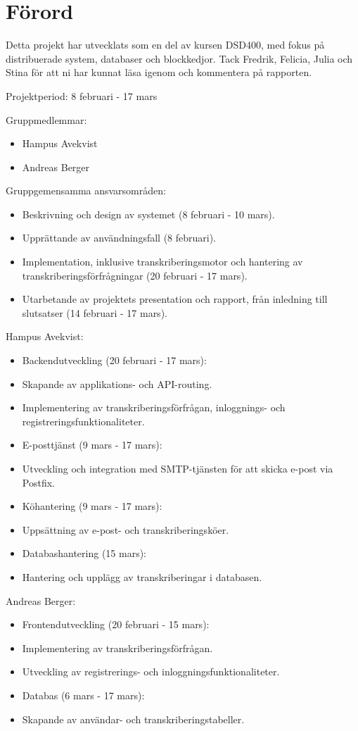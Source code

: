 \thispagestyle{plain}

\section{Förord}
Detta projekt har utvecklats som en del av kursen DSD400, med fokus på
distribuerade system, databaser och blockkedjor. Tack Fredrik, Felicia, Julia
och Stina för att ni har kunnat läsa igenom och kommentera på rapporten.

Projektperiod: 8 februari - 17 mars

Gruppmedlemmar:
\begin{itemize}
    \item Hampus Avekvist
    \item Andreas Berger
\end{itemize}

Gruppgemensamma ansvarsområden:
\begin{itemize}
    \item Beskrivning och design av systemet (8 februari - 10 mars).
    \item Upprättande av användningsfall (8 februari).
    \item Implementation, inklusive transkriberingsmotor och hantering av transkriberingsförfrågningar (20 februari - 17 mars).
    \item Utarbetande av projektets presentation och rapport, från inledning till slutsatser (14 februari - 17 mars).
\end{itemize}

Hampus Avekvist:
\begin{itemize}
    \item Backendutveckling (20 februari - 17 mars):
    \item Skapande av applikations- och API-routing.
    \item Implementering av transkriberingsförfrågan, inloggnings- och registreringsfunktionaliteter.
    \item E-posttjänst (9 mars - 17 mars):
    \item Utveckling och integration med SMTP-tjänsten för att skicka e-post via Postfix.
    \item Köhantering (9 mars - 17 mars):
    \item Uppsättning av e-post- och transkriberingsköer.
    \item Databashantering (15 mars):
    \item Hantering och upplägg av transkriberingar i databasen.
\end{itemize}

Andreas Berger:
\begin{itemize}
    \item Frontendutveckling (20 februari - 15 mars):
    \item Implementering av transkriberingsförfrågan.
    \item Utveckling av registrerings- och inloggningsfunktionaliteter.
    \item Databas (6 mars - 17 mars):
    \item Skapande av användar- och transkriberingstabeller.
\end{itemize}
